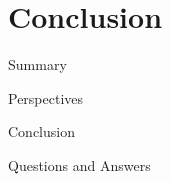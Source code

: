 \section{Conclusion}

\begin{frame}{Summary}
\end{frame}

\begin{frame}{Perspectives}
\end{frame}

\begin{frame}{Conclusion}
\end{frame}

\begin{frame}{Questions and Answers}
\end{frame}
